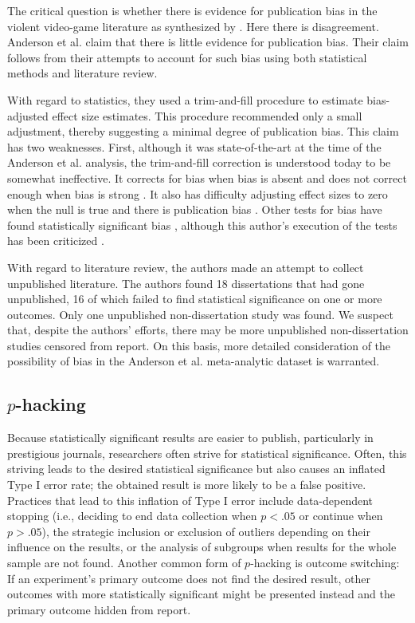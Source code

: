\documentclass[man, mask]{apa6}
\begin{document}
The critical question is whether there is evidence for publication bias in the violent video-game literature as synthesized by \citet{Anderson:etal:2010}.  Here there is disagreement.  Anderson et al. claim that there is little evidence for publication bias.  Their claim follows from their attempts to account for such bias using both statistical methods and literature review.  

With regard to statistics, they used a  trim-and-fill procedure to estimate bias-adjusted effect size estimates. This procedure recommended only a small adjustment, thereby suggesting a minimal degree of publication bias. This claim has two weaknesses. First, although it was state-of-the-art at the time of the Anderson et al. analysis, the trim-and-fill correction is understood today to be somewhat ineffective. It corrects for bias when bias is absent and does not correct enough when bias is strong \citep{Simonsohn:etal:2014b}. It also has difficulty adjusting effect sizes to zero when the null is true and there is publication bias \citep{Moreno:etal:2009}. Other tests for bias have found statistically significant  bias \citep{Ferguson:2007}, although this author's execution of the tests has been criticized \citep[see][]{Anderson:etal:2010}. 

With regard to literature review, the authors made an attempt to collect unpublished literature. The authors found 18 dissertations that had gone unpublished, 16 of which failed to find statistical significance on one or more outcomes. Only one unpublished non-dissertation study was found. We suspect that, despite the authors' efforts, there may be more unpublished non-dissertation studies censored from report. On this basis, more detailed consideration of the possibility of bias in the Anderson et al. meta-analytic dataset is warranted.

\subsection{$p$-hacking}
Because statistically significant results are easier to publish, particularly in prestigious journals, researchers often strive for statistical significance. Often, this striving leads to the desired statistical significance but also causes an inflated Type I error rate; the obtained result is more likely to be a false positive. Practices that lead to this inflation of Type I error include data-dependent stopping (i.e., deciding to end data collection when $p < .05$ or continue when $p > .05$), the strategic inclusion or exclusion of outliers depending on their influence on the results, or the analysis of subgroups when results for the whole sample are not found. Another common form of $p$-hacking is outcome switching: If an experiment's primary outcome does not find the desired result, other outcomes with more statistically significant might be presented instead and the primary outcome hidden from report.
\end{document}
